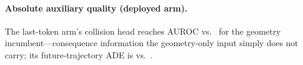 \documentclass[10pt,twocolumn,letterpaper]{article}
\begin{document}
\paragraph{Absolute auxiliary quality (deployed arm).}
The last-token arm's collision head reaches \AbsLasttokenCollisionAuroc{} AUROC vs.\ \AbsLegacyCollisionAuroc{} for the geometry incumbent---consequence information the geometry-only input simply does not carry; its future-trajectory ADE is \AbsLasttokenAde{} vs.\ \AbsLegacyAde.
\end{document}

